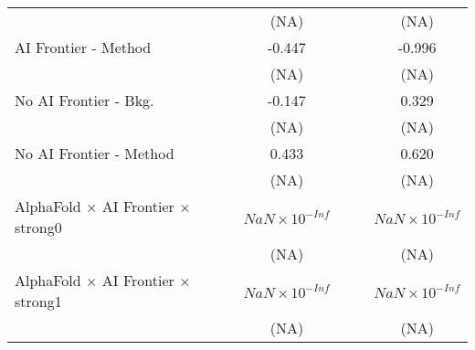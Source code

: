 \begin{tabular}{lcccccc}
                                                                              &                        &                        & (NA)                   &                        &                        & (NA)\\   
   AI Frontier - Method                                                       &                        &                        & -0.447                 &                        &                        & -0.996\\   
                                                                              &                        &                        & (NA)                   &                        &                        & (NA)\\   
   No AI Frontier - Bkg.                                                      &                        &                        & -0.147                 &                        &                        & 0.329\\   
                                                                              &                        &                        & (NA)                   &                        &                        & (NA)\\   
   No AI Frontier - Method                                                    &                        &                        & 0.433                  &                        &                        & 0.620\\   
                                                                              &                        &                        & (NA)                   &                        &                        & (NA)\\   
   AlphaFold $\times$ AI Frontier $\times$ strong0                            &                        &                        & $NaN\times 10^{-Inf}$  &                        &                        & $NaN\times 10^{-Inf}$\\    
                                                                              &                        &                        & (NA)                   &                        &                        & (NA)\\   
   AlphaFold $\times$ AI Frontier $\times$ strong1                            &                        &                        & $NaN\times 10^{-Inf}$  &                        &                        & $NaN\times 10^{-Inf}$\\    
                                                                              &                        &                        & (NA)                   &                        &                        & (NA)\\   

\end{tabular}
